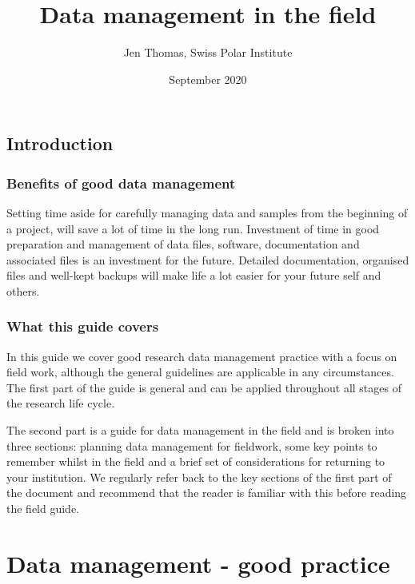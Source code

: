 \documentclass[12pt,a4paper,oneside]{report}
\title{Data management in the field}
\author{Jen Thomas, Swiss Polar Institute}
\date{September 2020}
\begin{document}
\maketitle

{
\hypersetup{linkcolor=}
\setcounter{tocdepth}{1}
\tableofcontents
}
\hypertarget{introduction}{%
\chapter{Introduction}\label{introduction}}

\hypertarget{benefits-of-good-data-management}{%
\section{Benefits of good data
management}\label{benefits-of-good-data-management}}

Setting time aside for carefully managing data and samples from the
beginning of a project, will save a lot of time in the long run.
Investment of time in good preparation and management of data files,
software, documentation and associated files is an investment for the
future. Detailed documentation, organised files and well-kept backups
will make life a lot easier for your future self and others.

\hypertarget{what-this-guide-covers}{%
\section{What this guide covers}\label{what-this-guide-covers}}

In this guide we cover good research data management practice with a
focus on field work, although the general guidelines are applicable in
any circumstances. The first part of the guide is general and can be
applied throughout all stages of the research life cycle.

The second part is a guide for data management in the field and is
broken into three sections: planning data management for fieldwork, some
key points to remember whilst in the field and a brief set of
considerations for returning to your institution. We regularly refer
back to the key sections of the first part of the document and recommend
that the reader is familiar with this before reading the field guide.

\hypertarget{data-management---good-practice}{%
\part{Data management - good
practice}\label{data-management---good-practice}}
\end{document}

